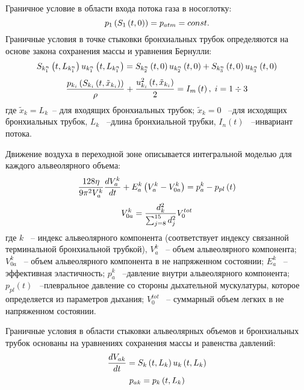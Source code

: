 Граничное условие в области входа потока газа в носоглотку: 
\begin{equation}
p_{1} \left(S_{1} \left(t,0\right)\right)=p_{atm} =const. \notag 
\end{equation} 
Граничные условия в точке стыковки бронхиальных трубок определяются на основе закона сохранения массы и уравнения Бернулли:  
\begin{equation} 
S_{k_{1}^{n} } \left(t,L_{k_{1}^{n} } \right)u_{k_{1}^{n} } \left(t,L_{k_{1}^{n} } \right)=S_{k_{2}^{n} } \left(t,0\right)u_{k_{2}^{n} } \left(t,0\right)+S_{k_{3}^{n} } \left(t,0\right)u_{k_{3}^{n} } \left(t,0\right)\notag
\end{equation} 
\begin{equation} 
\frac{p_{k_{i} } \left(S_{k_{i} } \left(t,\tilde{x}_{k_{i} } \right)\right)}{\rho } +\frac{u_{k_{i} }^{2} \left(t,\tilde{x}_{k_{i} } \right)}{2} =I_{m} \left(t\right),\; i=1\div 3\notag 
\end{equation} 
где $\tilde{x}_{k} =L_{k} $~-- для входящих бронхиальных трубок; $\tilde{x}_{k} =0$ ~--для исходящих бронхиальных трубок, $L_{k} $ ~--длина бронхиальной трубки, $I_{n} \left(t\right)$ ~--инвариант потока.


Движение воздуха в переходной зоне описывается интегральной моделью для каждого альвеолярного объема:
\begin{equation} 
\frac{128\eta }{9\pi ^{2} V_{a}^{k} } \frac{dV_{a}^{k} }{dt} +E_{a}^{k} \left(V_{a}^{k} -V_{0a}^{k} \right)=p_{a}^{k} -p_{pl} \left(t\right) \notag
\end{equation} 
\begin{equation} 
V_{0a}^{k} = \frac{d_{k}^{2}}{\sum_{j=8}^{15} d^{2}_{j}}V_{0}^{tot} \notag
\end{equation}
где $k$ ~-- индекс альвеолярного компонента (соответствует индексу связанной терминальной бронхиальной трубкой), $V_{a}^{k} $ ~-- объем альвеолярного компонента; $V_{0a}^{k} $ ~-- объем альвеолярного компонента в не напряженном состоянии; $E_{a}^{k} $ ~--эффективная эластичность; $p_{a}^{k} $ ~--давление внутри альвеолярного компонента; $p_{pl} \left(t\right)$ ~--плевральное давление со стороны дыхательной мускулатуры, которое определяется из параметров дыхания; $V_{0}^{tot} $ ~-- суммарный объем легких в не напряженном состоянии.

Граничные условия в области стыковки альвеолярных объемов и бронхиальных трубок основаны на уравнениях сохранения массы и равенства давлений:
\begin{equation} 
\frac{dV_{ak} }{dt} =S_{k} \left(t,L_{k} \right)u_{k} \left(t,L_{k} \right)\notag  
\end{equation} 
\begin{equation} 
p_{ak} =p_{k} \left(t,L_{k} \right)\notag 
\end{equation} 

